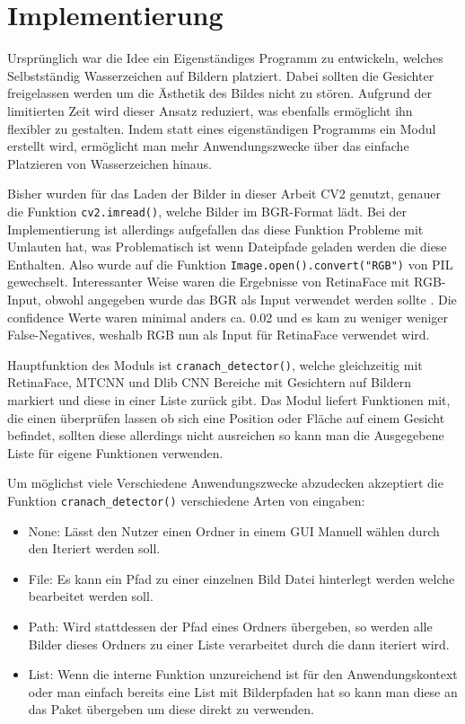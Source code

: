\chapter{Implementierung}

Ursprünglich war die Idee ein Eigenständiges Programm zu entwickeln, welches Selbstständig Wasserzeichen auf Bildern platziert. Dabei sollten die Gesichter freigelassen werden um die Ästhetik des Bildes nicht zu stören. Aufgrund der limitierten Zeit wird dieser Ansatz reduziert, was ebenfalls ermöglicht ihn flexibler zu gestalten. Indem statt eines eigenständigen Programms ein Modul erstellt wird, ermöglicht man mehr Anwendungszwecke über das einfache Platzieren von Wasserzeichen hinaus.

Bisher wurden für das Laden der Bilder in dieser Arbeit CV2 genutzt, genauer die Funktion \texttt{cv2.imread()}, welche Bilder im BGR-Format lädt. Bei der Implementierung ist allerdings aufgefallen das diese Funktion Probleme mit Umlauten hat, was Problematisch ist wenn Dateipfade geladen werden die diese Enthalten. Also wurde auf die Funktion \texttt{Image.open().convert("RGB")} von PIL gewechselt. Interessanter Weise waren die Ergebnisse von RetinaFace mit RGB-Input, obwohl angegeben wurde das BGR als Input verwendet werden sollte \parencite{lizardNttstar25}. Die confidence Werte waren minimal anders ca. 0.02 und es kam zu weniger weniger False-Negatives, weshalb RGB nun als Input für RetinaFace verwendet wird.

Hauptfunktion des Moduls ist \texttt{cranach\_detector()}, welche gleichzeitig mit RetinaFace, MTCNN und Dlib CNN Bereiche mit Gesichtern auf Bildern markiert und diese in einer Liste zurück gibt. Das Modul liefert Funktionen mit, die einen überprüfen lassen ob sich eine Position oder Fläche auf einem Gesicht befindet, sollten diese allerdings nicht ausreichen so kann man die Ausgegebene Liste für eigene Funktionen verwenden.

Um möglichst viele Verschiedene Anwendungszwecke abzudecken akzeptiert die Funktion \texttt{cranach\_detector()} verschiedene Arten von eingaben:
\begin{itemize}
  \item None: Lässt den Nutzer einen Ordner in einem GUI Manuell wählen durch den Iteriert werden soll.
  \item File: Es kann ein Pfad zu einer einzelnen Bild Datei hinterlegt werden welche bearbeitet werden soll.
  \item Path: Wird stattdessen der Pfad eines Ordners übergeben, so werden alle Bilder dieses Ordners zu einer Liste verarbeitet durch die dann iteriert wird.
  \item List: Wenn die interne Funktion unzureichend ist für den Anwendungskontext oder man einfach bereits eine List mit Bilderpfaden hat so kann man diese an das Paket übergeben um diese direkt zu verwenden.
\end{itemize}

